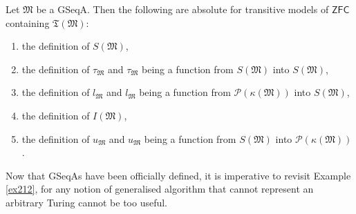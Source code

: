 \documentclass[12pt]{article}
\numberwithin{equation}{section}
\begin{document}
\begin{prop}\label{prop226}
Let $\mathfrak{M}$ be a GSeqA. Then the following are absolute for transitive models of $\mathsf{ZFC}$ containing $\mathfrak{T}(\mathfrak{M})$:
\begin{enumerate}[label=(\arabic*)]
    \item the definition of $S(\mathfrak{M})$,
    \item the definition of $\tau_{\mathfrak{M}}$ and $\tau_{\mathfrak{M}}$ being a function from $S(\mathfrak{M})$ into $S(\mathfrak{M})$,
    \item the definition of $l_{\mathfrak{M}}$ and $l_{\mathfrak{M}}$ being a function from $\mathcal{P}(\kappa(\mathfrak{M}))$ into $S(\mathfrak{M})$,
    \item the definition of $I(\mathfrak{M})$,
    \item the definition of $u_{\mathfrak{M}}$ and $u_{\mathfrak{M}}$ being a function from $S(\mathfrak{M})$ into $\mathcal{P}(\kappa(\mathfrak{M}))$. 
\end{enumerate}
\end{prop}

Now that GSeqAs have been officially defined, it is imperative to revisit Example \ref{ex212}, for any notion of generalised algorithm that cannot represent an arbitrary Turing cannot be too useful.
\end{document}
